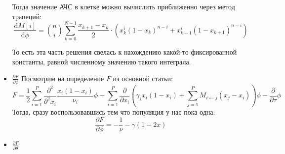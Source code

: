 \documentclass[10pt]{article}
\theoremstyle{plain}
\theoremstyle{remark}
\begin{document}
\begin{itemize}
  Тогда значение АЧС в клетке можно вычислить приближенно через метод трапеций:
  \begin{equation*}
    \frac{\mathrm{d} M[i]}{\mathrm{d} \phi} = \binom{n}{i}\sum_{k = 0}^{N - 1} \frac{x_{k + 1} - x_k}{2} \cdot (x_k^{i} (1 - x_k)^{n - i} + x_{k + 1}^{i} (1 - x_{k + 1})^{n - i})
  \end{equation*}
  
  То есть эта часть решения свелась к нахождению какой-то фиксированной константы, равной численному значению такого интеграла.

  \item $\boxed{\frac{\partial F}{\partial \phi}}$
  Посмотрим на определение $F$ из основной статьи:
  \begin{equation*}
    F = \frac{1}{2} \sum_{i = 1}^{P} \frac{\partial^2}{\partial^2 x_i} \frac{x_i(1 - x_i)}{\nu_i} \phi -
    \sum_{i = 1}^P \frac{\partial}{\partial x_i} \left(\gamma_i x_i(1 - x_i) + \sum_{j = 1}^P M_{i \leftarrow j} (x_j - x_i) \right)\phi -
    \frac{\partial}{\partial \tau } \phi
  \end{equation*}
  Тогда, сразу воспользовавшись тем что популяция у нас пока одна:
  \begin{equation*}
    \frac{\partial F}{\partial \phi} = -\frac{1}{\nu} -\gamma (1 - 2x)
  \end{equation*}

  \item $\boxed{\frac{\partial F}{\partial \theta}}$


\end{itemize}
\end{document}
